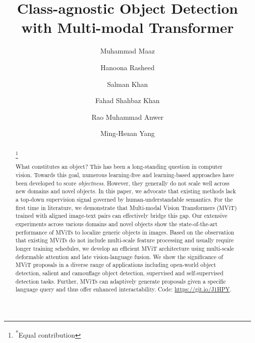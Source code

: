 \documentclass[runningheads]{llncs}
\newcommand\blfootnote[1]{\begingroup
  \renewcommand\thefootnote{}\footnote{#1}\addtocounter{footnote}{-1}\endgroup
}
\begin{document}
\pagestyle{headings}
\mainmatter
\def\ECCVSubNumber{6491}  

\title{Class-agnostic Object Detection with Multi-modal Transformer} 

\begin{comment}
\titlerunning{ECCV-22 submission ID \ECCVSubNumber} 
\authorrunning{ECCV-22 submission ID \ECCVSubNumber} 
\author{Anonymous ECCV submission}
\institute{Paper ID \ECCVSubNumber}
\end{comment}


\author{
Muhammad Maaz \and
Hanoona Rasheed \and
Salman Khan \and
Fahad Shahbaz Khan \and
Rao Muhammad Anwer \and
Ming-Hsuan Yang
}
\maketitle

\begin{abstract}
\blfootnote{\textsuperscript{*}Equal contribution}
What constitutes an object? This has been a long-standing question in computer vision. Towards this goal, numerous learning-free and learning-based approaches have been developed to score \emph{objectness}. However, they generally do not scale well across new domains and novel objects. In this paper, we advocate that existing methods lack a top-down supervision signal governed by human-understandable semantics. For the first time in literature, we demonstrate that Multi-modal Vision Transformers (MViT) trained with aligned image-text pairs can effectively bridge this gap. Our extensive experiments across various domains and novel objects show the state-of-the-art performance of MViTs to localize generic objects in images. Based on the observation that existing MViTs do not include multi-scale feature processing and usually require longer training schedules, we develop an efficient MViT architecture using multi-scale deformable attention and late vision-language fusion. We show the significance of MViT proposals in a diverse range of applications including open-world object detection, salient and camouflage object detection, supervised and self-supervised detection tasks. Further, MViTs can adaptively generate proposals given a  specific language query and thus offer enhanced interactability. Code: \url{https://git.io/J1HPY}.

\end{abstract}
\end{document}
